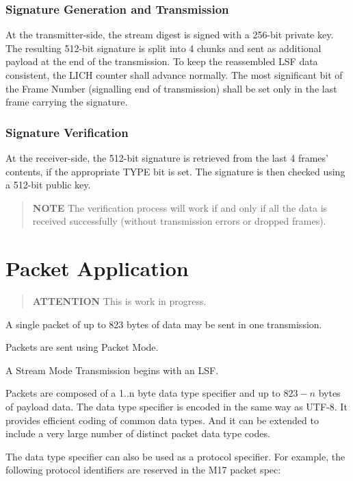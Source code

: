 \documentclass[a4paper,11pt,oneside]{book}
\begin{document}
\subsubsection{Signature Generation and Transmission}
At the transmitter-side, the stream digest is signed with a 256-bit private key. The resulting 512-bit signature is split into 4 chunks and sent as additional payload at the end of the transmission. To keep the reassembled LSF data consistent, the LICH counter shall advance normally. The most significant bit of the Frame Number (signalling end of transmission) shall be set only in the last frame carrying the signature.

\subsubsection{Signature Verification}
At the receiver-side, the 512-bit signature is retrieved from the last 4 frames' contents, if the appropriate TYPE bit is set. The signature is then checked using a 512-bit public key. 
\begin{quote}
	\textbf{NOTE} The verification process will work if and only if all the data is received successfully (without transmission errors or dropped frames).
\end{quote}

\section{Packet Application}

\begin{quote}
	\textbf{ATTENTION} This is work in progress.
\end{quote}

A single packet of up to 823 bytes of data may be sent in one transmission.

Packets are sent using Packet Mode.

A Stream Mode Transmission begins with an LSF.

Packets are composed of a 1..n byte data type specifier and up to $823-n$ bytes of payload data. The data type specifier is encoded in the same way as UTF-8. It provides efficient coding of common data types. And it can be extended to include a very large number of distinct packet data type codes.

The data type specifier can also be used as a protocol specifier. For example, the following protocol identifiers are reserved in the M17 packet spec:
\end{document}
